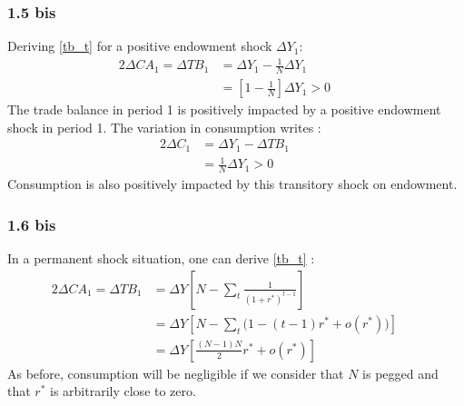 \documentclass{article}
\begin{document}
\subsubsection*{1.5 bis}
Deriving \eqref{tb_t} for a positive endowment shock $\Delta Y_1$:
\begin{alignat*}{2}
    \Delta CA_1 = \Delta TB_1 &= \Delta Y_1 - \frac{1}{N} \Delta Y_1 \quad&\\
    &= \left[ 1 - \frac{1}{N}\right] \Delta Y_1 > 0 \quad&
    \label{Delta_tb}
\end{alignat*}
The trade balance in period 1 is positively impacted by a positive endowment shock in period 1. The variation in consumption writes :
\begin{alignat*}{2}
    \Delta C_1 &= \Delta Y_1 - \Delta TB_1 \quad&\\
    &= \frac{1}{N} \Delta Y_1 > 0 \quad&
\end{alignat*}
Consumption is also positively impacted by this transitory shock on endowment.
\subsubsection*{1.6 bis}
In a permanent shock situation, one can derive \eqref{tb_t} :
\begin{alignat*}{2}
    \Delta CA_1 = \Delta TB_1 &= \Delta Y \left[N - \sum_t \frac{1}{(1+r^*)^{t-1}} \right]\quad&\\
    &= \Delta Y \left[N - \sum_t \Big(1 - (t-1)r^* + o(r^*) \Big)\right] \quad&\\
    &= \Delta Y \left[\frac{(N-1)N}{2} r^* + o(r^*) \right]\quad&
\end{alignat*}
As before, consumption will be negligible if we consider that $N$ is pegged and that $r^*$ is arbitrarily close to zero.
\end{document}
